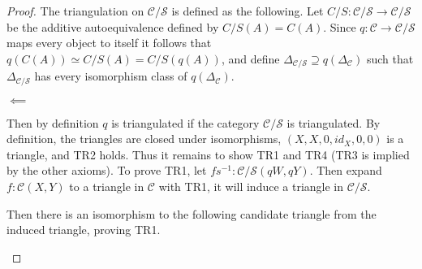     \begin{proof}
        The triangulation on $\mathcal{C}/\mathcal{S}$ is defined as the following. Let $C/S:\mathcal{C}/\mathcal{S}\rightarrow\mathcal{C}/\mathcal{S}$ be the additive autoequivalence defined by $C/S(A)=C(A)$. Since $q:\mathcal{C}\rightarrow\mathcal{C}/\mathcal{S}$ maps every object to itself it follows that $q(C(A)) \simeq C/S(A) = C/S(q(A))$, and define $\Delta_{\mathcal{C}/\mathcal{S}}\supseteq q(\Delta_\mathcal{C})$ such that $\Delta_{\mathcal{C}/\mathcal{S}}$ has every isomorphism class of $q(\Delta_\mathcal{C})$. 
        \begin{center}
            $\impliedby$
        \end{center}
        Then by definition $q$ is triangulated if the category $\mathcal{C}/\mathcal{S}$ is triangulated.
        By definition, the triangles are closed under isomorphisms, $(X,X,0,id_X,0,0)$ is a triangle, and TR2 holds. Thus it remains to show TR1 and TR4 (TR3 is implied by the other axioms). To prove TR1, let $fs^{-1}:\mathcal{C}/\mathcal{S}(qW,qY)$. Then expand $f:\mathcal{C}(X,Y)$ to a triangle in $\mathcal{C}$ with TR1, it will induce a triangle in  $\mathcal{C}/\mathcal{S}$.
        \begin{center}
        \end{center}
        Then there is an isomorphism to the following candidate triangle from the induced triangle, proving TR1.
        \begin{center}
\end{center}
\end{proof}

